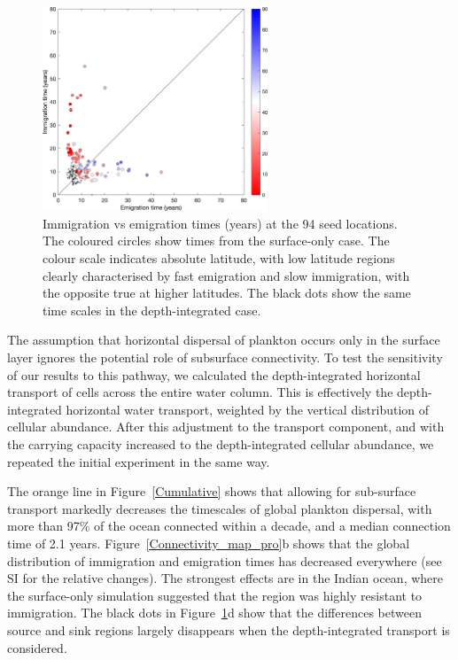 \documentclass[12pt]{article}
\begin{document}
\begin{figure}[t!]
    \centering
        \includegraphics[width=0.6\textwidth]{../Figures/imm_vs_em.png}
    \caption{Immigration vs emigration times (years) at the 94 seed locations. The coloured circles show times from the surface-only case. The colour scale indicates absolute latitude, with low latitude regions clearly characterised by fast emigration and slow immigration, with the opposite true at higher latitudes. The black dots show the same time scales in the depth-integrated case.}
\label{Imm_vs_em}
\end{figure}

The assumption that horizontal dispersal of plankton occurs only in the surface layer ignores the potential role of subsurface connectivity. To test the sensitivity of our results to this pathway, we calculated the depth-integrated horizontal transport of cells across the entire water column. This is effectively the depth-integrated horizontal water transport, weighted by the vertical distribution of cellular abundance. After this adjustment to the transport component, and with the carrying capacity increased to the depth-integrated cellular abundance, we repeated the initial experiment in the same way. 

The orange line in Figure~\ref{Cumulative} shows that allowing for sub-surface transport markedly decreases the timescales of global plankton dispersal, with more than 97\% of the ocean connected within a decade, and a median connection time of 2.1 years. Figure~\ref{Connectivity_map_pro}b shows that the global distribution of immigration and emigration times has decreased everywhere (see SI for the relative changes). The strongest effects are in the Indian ocean, where the surface-only simulation suggested that the region was highly resistant to immigration. The black dots in Figure~\ref{Imm_vs_em}d show that the differences between source and sink regions largely disappears when the depth-integrated transport is considered. 
\end{document}
